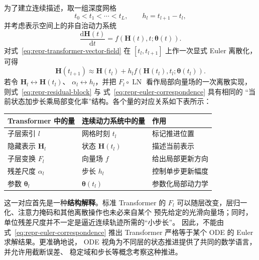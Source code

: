 \documentclass[UTF8,a4paper,zihao=-4,oneside,openany]{ctexbook}
\begin{document}
为了建立连续描述，取一组深度网格
\[
    t_0<t_1<\cdots<t_L,
    \qquad
    h_l=t_{l+1}-t_l,
\]
并考虑表示空间上的非自治动力系统
\begin{equation}
    \frac{\mathrm{d}\boldsymbol{H}(t)}{\mathrm{d}t}
    =
    f\!\left(
        \boldsymbol{H}(t),t;
        \boldsymbol{\theta}(t)
    \right).
    \label{eq:repr-transformer-vector-field}
\end{equation}
对式~\eqref{eq:repr-transformer-vector-field} 在
\([t_l,t_{l+1}]\) 上作一次显式 Euler 离散化，可得
\begin{equation}
    \boldsymbol{H}(t_{l+1})
    \approx
    \boldsymbol{H}(t_l)
    +
    h_l
    f\!\left(
        \boldsymbol{H}(t_l),t_l;
        \boldsymbol{\theta}(t_l)
    \right).
    \label{eq:repr-euler-correspondence}
\end{equation}
若令
\(\boldsymbol{H}_{l}\leftrightarrow\boldsymbol{H}(t_l)\)、
\(\alpha_l\leftrightarrow h_l\)，并把
\(F_l\circ\operatorname{LN}\) 看作局部向量场的一次离散实现，
则式~\eqref{eq:repr-residual-block} 与
式~\eqref{eq:repr-euler-correspondence} 具有相同的
“当前状态加步长乘局部变化率”结构。各个量的对应关系如下表所示：
\begin{center}
\begin{tabular}{lll}
    \toprule
    Transformer 中的量 & 连续动力系统中的量 & 作用 \\
    \midrule
    子层索引 \(l\) & 网格时刻 \(t_l\) & 标记推进位置 \\
    隐藏表示 \(\boldsymbol{H}_l\) & 状态 \(\boldsymbol{H}(t_l)\) & 描述当前表示 \\
    子层变换 \(F_l\) & 向量场 \(f\) & 给出局部更新方向 \\
    残差尺度 \(\alpha_l\) & 步长 \(h_l\) & 控制单步更新幅度 \\
    参数 \(\boldsymbol{\theta}_l\) & \(\boldsymbol{\theta}(t_l)\) & 参数化局部动力学 \\
    \bottomrule
\end{tabular}
\end{center}

这一对应首先是一种\textbf{结构解释}。标准 Transformer 的
\(F_l\) 可以随层改变，层归一化、注意力掩码和其他离散操作也未必来自某个
预先给定的光滑向量场；同时，单位残差尺度并不一定是逼近连续轨迹所需的“小步长”。
因此，不能由式~\eqref{eq:repr-euler-correspondence} 推出
Transformer 严格等于某个 ODE 的 Euler 求解结果。更准确地说，
ODE 视角为不同层的状态推进提供了共同的数学语言，并允许用截断误差、
稳定域和步长等概念考察这种推进。
\end{document}
